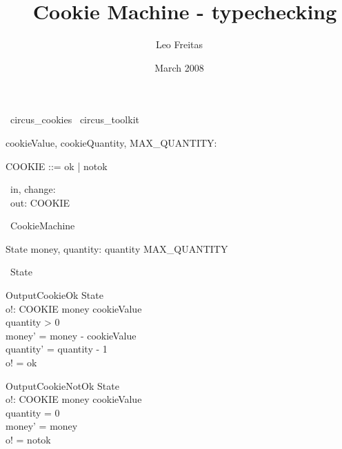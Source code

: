 \documentclass{article}
\begin{document}
\title{\Circus\ Cookie Machine - typechecking}
\author{Leo Freitas}
\date{March 2008}

\maketitle

\begin{zsection}
  \SECTION\ circus\_cookies \parents\ circus\_toolkit
\end{zsection}

\begin{axdef}
   cookieValue, cookieQuantity, MAX\_QUANTITY: \nat
\end{axdef}

\begin{zed}
   COOKIE ::= ok | notok
\end{zed}

\begin{circus}
   \circchannel\ in, change: \nat \\
   \circchannel\ out: COOKIE
\end{circus}

\begin{circus}
   \circprocess\ CookieMachine \circdef \circbegin
\end{circus}

\begin{schema}{State}
   money, quantity: \nat
\where
   quantity \leq MAX\_QUANTITY
\end{schema}

\begin{circusaction}
   \circstate\ State
\end{circusaction}

\begin{schema}{OutputCookieOk}
   \Delta State \\   
   o!: COOKIE
\where
   money \geq cookieValue \\
   quantity > 0 \\
   money' = money - cookieValue \\
   quantity' = quantity - 1 \\
   o! = ok
\end{schema}

\begin{schema}{OutputCookieNotOk}
   \Delta State \\
   o!: COOKIE
\where
   money \geq cookieValue \\
   quantity = 0 \\
   money' = money \\
   o! = notok
\end{schema}
\end{document}
